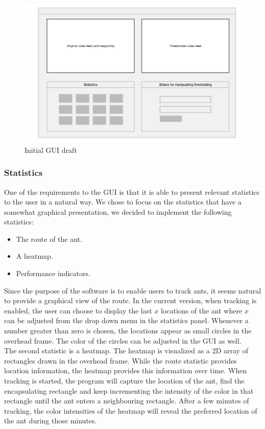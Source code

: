 \begin{figure}[!ht]
    \centering
    \includegraphics[scale = 0.3]{img/termes_gui.png}
    \caption{Initial GUI draft}
    \label{fig:gui}
\end{figure}

\subsubsection{Statistics} \mbox{}\par
One of the requirements to the GUI is that it is able to present relevant statistics to the user in a natural way. We chose to focus on the statistics that have a somewhat graphical presentation, we decided to implement the following statistics:

\begin{itemize}
  \item{The route of the ant.}
  \item{A heatmap.}
  \item{Performance indicators.}
\end{itemize}

Since the purpose of the software is to enable users to track ants, it seems natural to provide a graphical view of the route. In the current version, when tracking is enabled, the user can choose to display the last $x$ locations of the ant where $x$ can be adjusted from the drop down menu in the statistics panel. Whenever a number greater than zero is chosen, the locations appear as small circles in the overhead frame.
The color of the circles can be adjusted in the GUI as well. \\	

The second statistic is a heatmap. The heatmap is visualized as a 2D array of rectangles drawn in the overhead frame. While the route statistic provides location information, the heatmap provides this information over time. When tracking is started, the program will capture the location of the ant, find the encapsulating rectangle and keep incrementing the intensity of the color in that rectangle until the ant enters a neighbouring rectangle. After a few minutes of tracking, the color intensities of the heatmap will reveal the preferred location of the ant during those minutes. \\


